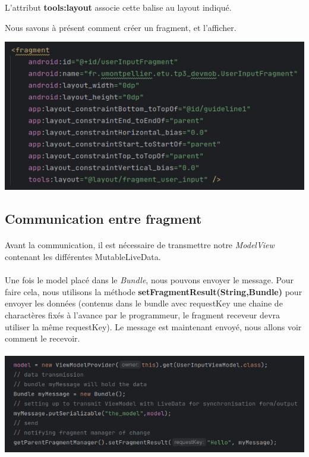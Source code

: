 \documentclass[a4paper]{article}
\begin{document}
\begin{multicols}{2}
                    L'attribut \textbf{tools:layout} associe cette balise au layout indiqué.

                    Nous savons à présent comment créer un fragment, et l'afficher.
                    \begin{center}
                        \noindent\includegraphics[width=.40\textwidth]{fragment/layout}
                    \end{center}
            
            \subsection{Communication entre fragment}
                \paragraph{}
                    Avant la communication, il est nécessaire de transmettre notre \emph{ModelView} contenant les différentes MutableLiveData.
                \paragraph{}
                    Une fois le model placé dans le \emph{Bundle}, nous pouvons envoyer le message. Pour faire cela, nous utilisons la méthode \textbf{setFragmentResult(String,Bundle)} pour envoyer les données (contenus dans le bundle avec requestKey une chaine de charactères fixés à l'avance par le programmeur, le fragment receveur devra utiliser la même requestKey). Le message est maintenant envoyé, nous allons voir comment le recevoir.
                        \\\\
                        \noindent\includegraphics[width=.47\textwidth]{fragment/set}

\end{multicols}
\end{document}
